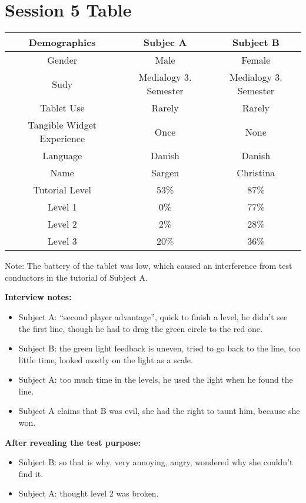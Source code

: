 \section*{Session 5 Table}
\begin{tabular}{|c|c|c|}
\hline 
\textbf{Demographics} & Subjec A & Subject B \\ 
\hline 
Gender & Male  & Female \\ 
\hline 
Sudy & Medialogy 3. Semester  & Medialogy 3. Semester\\ 
\hline 
Tablet Use & Rarely & Rarely\\ 
\hline 
Tangible Widget Experience & Once & None  \\ 
\hline 
Language & Danish & Danish\\ 
\hline 
Name & Sargen & Christina\\ 
\hline \hline
Tutorial Level & 53\% & 87\% \\ 
\hline 
Level 1 & 0\% & 77\% \\ 
\hline 
Level 2 & 2\% & 28\% \\ 
\hline 
Level 3 & 20\% & 36\% \\ 
\hline 
\end{tabular} 

Note: The battery of the tablet was low, which caused an interference from test conductors in the tutorial of Subject A.

\textbf{Interview notes:}
\begin{itemize}
\item Subject A: “second player advantage”, quick to finish a level, he didn’t see the first line, though he had to drag the green circle to the red one. 
\item Subject B: the green light feedback is uneven, tried to go back to the line, too little time, looked mostly on the light as a scale.
\item Subject A: too much time in the levels, he used the light when he found the line.
\item Subject A claims that B was evil, she had the right to taunt him, because she won. 
\end{itemize}

\textbf{After revealing the test purpose:}
\begin{itemize}
\item Subject B: so that is why, very annoying, angry, wondered why she couldn’t find it.
\item Subject A: thought level 2 was broken.
\end{itemize}

